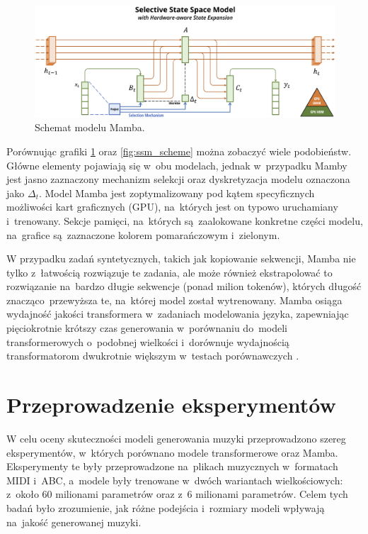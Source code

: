 \documentclass[data-science]{agh-wi} %
\begin{document}
\begin{figure}[ht!]
    \begin{center}
        \includegraphics[width=0.9\linewidth]{img/mamba1.png}
    \end{center}
    \caption{Schemat modelu Mamba.}
    \label{fig:mamba1}
\end{figure}

Porównując grafiki \ref*{fig:mamba1} oraz \ref*{fig:ssm_scheme} można zobaczyć wiele podobieństw. Główne elementy pojawiają się w~obu modelach, jednak w~przypadku Mamby jest jasno zaznaczony mechanizm selekcji oraz dyskretyzacja modelu oznaczona jako $\Delta_t$. Model Mamba jest zoptymalizowany pod kątem specyficznych możliwości kart graficznych (GPU), na~których jest on typowo uruchamiany i~trenowany. Sekcje pamięci, na~których są~zaalokowane konkretne części modelu, na~grafice są~zaznaczone kolorem pomarańczowym i~zielonym.

W przypadku zadań syntetycznych, takich jak kopiowanie sekwencji, Mamba nie tylko z~łatwością rozwiązuje te zadania, ale może również ekstrapolować to rozwiązanie na~bardzo długie sekwencje (ponad milion tokenów), których długość znacząco~przewyższa te, na~której model został wytrenowany. Mamba osiąga wydajność jakości transformera w~zadaniach modelowania języka, zapewniając pięciokrotnie krótszy czas generowania w~porównaniu do~modeli transformerowych o~podobnej wielkości i~dorównuje wydajnością transformatorom dwukrotnie większym w~testach porównawczych \cite{mamba}.

\chapter{Przeprowadzenie eksperymentów}
W celu oceny skuteczności modeli generowania muzyki przeprowadzono szereg eksperymentów, w~których porównano modele transformerowe oraz Mamba. Eksperymenty te były przeprowadzone na~plikach muzycznych w~formatach MIDI i~ABC, a~modele były trenowane w~dwóch wariantach wielkościowych: z~około 60 milionami parametrów oraz z~6 milionami parametrów. Celem tych badań było zrozumienie, jak różne podejścia i~rozmiary modeli wpływają na~jakość generowanej muzyki.
\end{document}
